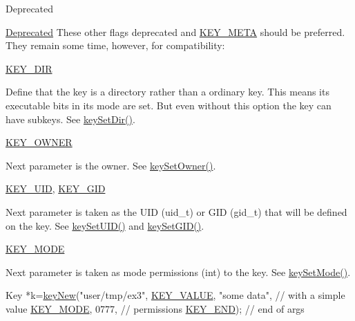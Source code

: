 \begin{DoxyRefDesc}{Deprecated}
\item[\hyperlink{deprecated__deprecated000008}{Deprecated}]These other flags deprecated and \hyperlink{group__key_gga91fb3178848bd682000958089abbaf40a040582834bb2d90049947d7ef74e87e2}{K\-E\-Y\-\_\-\-M\-E\-T\-A} should be preferred. They remain some time, however, for compatibility\-:
\begin{DoxyItemize}
\item \hyperlink{group__key_gga91fb3178848bd682000958089abbaf40a9e43e47c8a21478538e2d20e049981d5}{K\-E\-Y\-\_\-\-D\-I\-R} \par
 Define that the key is a directory rather than a ordinary key. This means its executable bits in its mode are set. But even without this option the key can have subkeys. See \hyperlink{group__meta_gaae575bd86a628a15ee45baa860522e75}{key\-Set\-Dir()}.
\item \hyperlink{group__key_gga91fb3178848bd682000958089abbaf40a77ca60362fa8daca8d5347db4385068b}{K\-E\-Y\-\_\-\-O\-W\-N\-E\-R} \par
 Next parameter is the owner. See \hyperlink{group__meta_ga88d6ec200ba0707b7c1b4a88133d2be4}{key\-Set\-Owner()}.
\item \hyperlink{group__key_gga91fb3178848bd682000958089abbaf40a28f01a87d65f065172f734c9c9446c0e}{K\-E\-Y\-\_\-\-U\-I\-D}, \hyperlink{group__key_gga91fb3178848bd682000958089abbaf40ac0628bbaba7c837ca73323681393d15f}{K\-E\-Y\-\_\-\-G\-I\-D} \par
 Next parameter is taken as the U\-I\-D (uid\-\_\-t) or G\-I\-D (gid\-\_\-t) that will be defined on the key. See \hyperlink{group__meta_gab5f284f5ecd261e0a290095f50ba1af7}{key\-Set\-U\-I\-D()} and \hyperlink{group__meta_ga9e3d0fb3f7ba906e067727b9155d22e3}{key\-Set\-G\-I\-D()}.
\item \hyperlink{group__key_gga91fb3178848bd682000958089abbaf40a1b0a91ff3a855d6993930ebf0abaa518}{K\-E\-Y\-\_\-\-M\-O\-D\-E} \par
 Next parameter is taken as mode permissions (int) to the key. See \hyperlink{group__meta_ga8803037e35b9da1ce492323a88ff6bc3}{key\-Set\-Mode()}. 
\begin{DoxyCodeInclude}
Key *k=\hyperlink{group__key_gad23c65b44bf48d773759e1f9a4d43b89}{keyNew}(\textcolor{stringliteral}{"user/tmp/ex3"},
        \hyperlink{group__key_gga91fb3178848bd682000958089abbaf40ac66e4a49d09212b79f5754ca6db5bd2e}{KEY\_VALUE}, \textcolor{stringliteral}{"some data"},    \textcolor{comment}{// with a simple value}
        \hyperlink{group__key_gga91fb3178848bd682000958089abbaf40a1b0a91ff3a855d6993930ebf0abaa518}{KEY\_MODE}, 0777,            \textcolor{comment}{// permissions}
        \hyperlink{group__key_gga91fb3178848bd682000958089abbaf40aa8adb6fcb92dec58fb19410eacfdd403}{KEY\_END});                  \textcolor{comment}{// end of args}
\end{DoxyCodeInclude}


\end{DoxyItemize}
\end{DoxyRefDesc}
